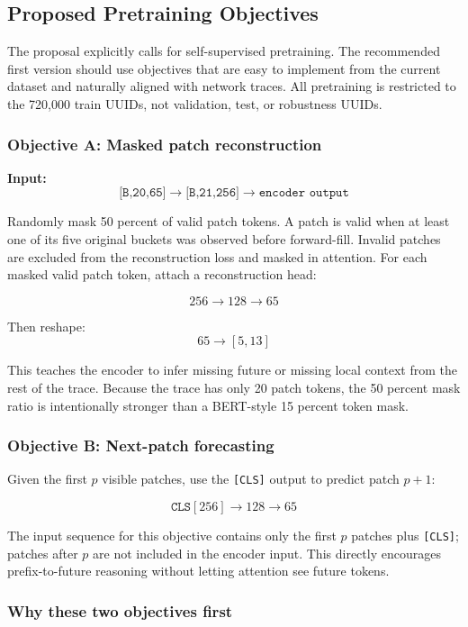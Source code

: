\documentclass[11pt]{article}
\begin{document}
\subsection{Proposed Pretraining Objectives}

The proposal explicitly calls for self-supervised pretraining. The recommended first version should use objectives that are easy to implement from the current dataset and naturally aligned with network traces. All pretraining is restricted to the 720,000 train UUIDs, not validation, test, or robustness UUIDs.

\subsubsection*{Objective A: Masked patch reconstruction}

\textbf{Input:}
\[
\texttt{[B,20,65]} \rightarrow \texttt{[B,21,256]} \rightarrow \texttt{encoder output}
\]

Randomly mask 50 percent of valid patch tokens. A patch is valid when at least one of its five original buckets was observed before forward-fill. Invalid patches are excluded from the reconstruction loss and masked in attention. For each masked valid patch token, attach a reconstruction head:

\[
256 \rightarrow 128 \rightarrow 65
\]

Then reshape:
\[
65 \rightarrow [5,13]
\]

This teaches the encoder to infer missing future or missing local context from the rest of the trace. Because the trace has only 20 patch tokens, the 50 percent mask ratio is intentionally stronger than a BERT-style 15 percent token mask.

\subsubsection*{Objective B: Next-patch forecasting}

Given the first \(p\) visible patches, use the \texttt{[CLS]} output to predict patch \(p+1\):

\[
\texttt{CLS}[256] \rightarrow 128 \rightarrow 65
\]

The input sequence for this objective contains only the first \(p\) patches plus \texttt{[CLS]}; patches after \(p\) are not included in the encoder input. This directly encourages prefix-to-future reasoning without letting attention see future tokens.

\subsubsection*{Why these two objectives first}
\end{document}
